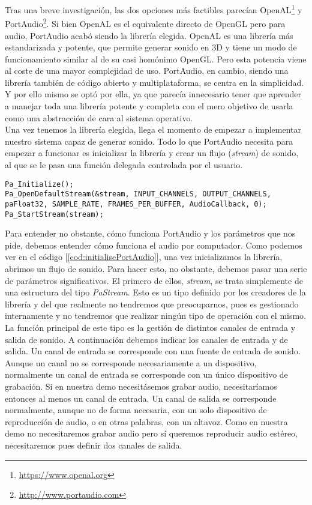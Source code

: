 Tras una breve investigación, las dos opciones más factibles parecían OpenAL\footnote{\url{https://www.openal.org}} y PortAudio\footnote{\url{http://www.portaudio.com}}. Si bien OpenAL es el equivalente directo de OpenGL pero para audio, PortAudio acabó siendo la librería elegida. OpenAL es una librería más estandarizada y potente, que permite generar sonido en 3D y tiene un modo de funcionamiento similar al de su casi homónimo OpenGL. Pero esta potencia viene al coste de una mayor complejidad de uso. PortAudio, en cambio, siendo una librería también de código abierto y multiplataforma, se centra en la simplicidad. Y por ello mismo se optó por ella, ya que parecía innecesario tener que aprender a manejar toda una librería potente y completa con el mero objetivo de usarla como una abstracción de cara al sistema operativo.\\

Una vez tenemos la librería elegida, llega el momento de empezar a implementar nuestro sistema capaz de generar sonido. Todo lo que PortAudio necesita para empezar a funcionar es inicializar la librería y crear un flujo (\emph{stream}) de sonido, al que se le pasa una función delegada controlada por el usuario.\\

\begin{lstlisting}[style=C-color, caption={Código necesario para inicializar PortAudio},label=cod:initialisePortAudio]
Pa_Initialize();
Pa_OpenDefaultStream(&stream, INPUT_CHANNELS, OUTPUT_CHANNELS, paFloat32, SAMPLE_RATE, FRAMES_PER_BUFFER, AudioCallback, 0);
Pa_StartStream(stream);
\end{lstlisting}

Para entender no obstante, cómo funciona PortAudio y los parámetros que nos pide, debemos entender cómo funciona el audio por computador. Como podemos ver en el código [\ref{cod:initialisePortAudio}], una vez inicializamos la librería, abrimos un flujo de sonido. Para hacer esto, no obstante, debemos pasar una serie de parámetros significativos. El primero de ellos, \emph{stream}, se trata simplemente de una estructura del tipo \emph{PaStream}. Esto es un tipo definido por los creadores de la librería y del que realmente no tendremos que preocuparnos, pues es gestionado internamente y no tendremos que realizar ningún tipo de operación con el mismo. La función principal de este tipo es la gestión de distintos canales de entrada y salida de sonido. A continuación debemos indicar los canales de entrada y de salida. Un canal de entrada se corresponde con una fuente de entrada de sonido. Aunque un canal no se corresponde necesariamente a un dispositivo, normalmente un canal de entrada se corresponde con un único dispositivo de grabación. Si en nuestra demo necesitásemos grabar audio, necesitaríamos entonces al menos un canal de entrada. Un canal de salida se corresponde normalmente, aunque no de forma necesaria, con un solo dispositivo de reproducción de audio, o en otras palabras, con un altavoz. Como en nuestra demo no necesitaremos grabar audio pero sí queremos reproducir audio estéreo, necesitaremos pues definir dos canales de salida.\\

